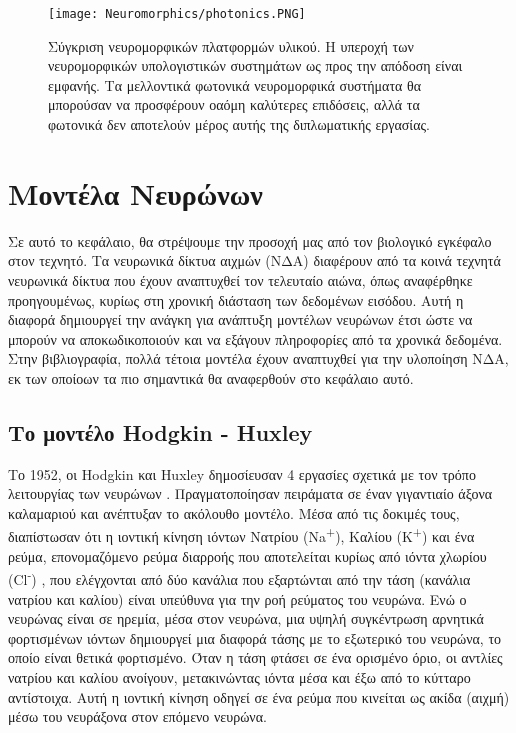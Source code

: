 \documentclass[12pt]{report}
\begin{document}
\begin{figure}[htp]
    \centering
    \texttt{[image: Neuromorphics/photonics.PNG]}
    \caption{Σύγκριση νευρομορφικών πλατφορμών υλικού. Η υπεροχή των νευρομορφικών υπολογιστικών συστημάτων ως προς την απόδοση είναι εμφανής. Τα μελλοντικά φωτονικά νευρομορφικά συστήματα θα μπορούσαν να προσφέρουν οαόμη καλύτερες επιδόσεις, αλλά τα φωτονικά δεν αποτελούν μέρος αυτής της διπλωματικής εργασίας.\cite{shastri2018} }
    \label{fig:overview}
\end{figure}


\chapter{Μοντέλα Νευρώνων}

Σε αυτό το κεφάλαιο, θα στρέψουμε την προσοχή μας από τον βιολογικό εγκέφαλο στον τεχνητό. Τα νευρωνικά δίκτυα αιχμών (ΝΔΑ) διαφέρουν από τα κοινά τεχνητά νευρωνικά δίκτυα που έχουν αναπτυχθεί τον τελευταίο αιώνα, όπως αναφέρθηκε προηγουμένως, κυρίως στη χρονική διάσταση των δεδομένων εισόδου. Αυτή η διαφορά δημιουργεί την ανάγκη για ανάπτυξη μοντέλων νευρώνων έτσι ώστε να μπορούν να αποκωδικοποιούν και να εξάγουν πληροφορίες από τα χρονικά δεδομένα. Στην βιβλιογραφία, πολλά τέτοια μοντέλα έχουν αναπτυχθεί για την υλοποίηση ΝΔΑ, εκ των οποίοων τα πιο σημαντικά θα αναφερθούν στο κεφάλαιο αυτό. 

\section{Το μοντέλο \textlatin{Hodgkin - Huxley}}
Το 1952, οι \textlatin{Hodgkin} και \textlatin{Huxley} δημοσίευσαν 4 εργασίες σχετικά με τον τρόπο λειτουργίας των νευρώνων \cite{Johnson2017}. Πραγματοποίησαν πειράματα σε έναν γιγαντιαίο άξονα καλαμαριού και ανέπτυξαν το ακόλουθο μοντέλο. Μέσα από τις δοκιμές τους, διαπίστωσαν ότι η ιοντική κίνηση ιόντων Νατρίου (\textlatin{Na\textsuperscript{+}}), Καλίου (\textlatin{K\textsuperscript{+}}) και ένα ρεύμα, επονομαζόμενο ρεύμα διαρροής που αποτελείται κυρίως από ιόντα χλωρίου (\textlatin{Cl\textsuperscript{-}}) , που ελέγχονται από δύο κανάλια που εξαρτώνται από την τάση (κανάλια νατρίου και καλίου) είναι υπεύθυνα για την ροή ρεύματος του νευρώνα. Ενώ ο νευρώνας είναι σε ηρεμία, μέσα στον νευρώνα, μια υψηλή συγκέντρωση αρνητικά φορτισμένων ιόντων δημιουργεί μια διαφορά τάσης με το εξωτερικό του νευρώνα, το οποίο είναι θετικά φορτισμένο. Όταν η τάση φτάσει σε ένα ορισμένο όριο, οι αντλίες νατρίου και καλίου ανοίγουν, μετακινώντας ιόντα μέσα και έξω από το κύτταρο αντίστοιχα. Αυτή η ιοντική κίνηση οδηγεί σε ένα ρεύμα που κινείται ως ακίδα (αιχμή) μέσω του νευράξονα στον επόμενο νευρώνα.
\end{document}
